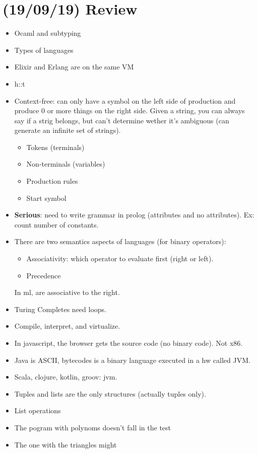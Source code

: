 \documentclass[11pt]{article}
\begin{document}
\section{(19/09/19) Review}
\label{sec:org1dee997}
\begin{itemize}
\item Ocaml and subtyping
\item Types of languages
\item Elixir and Erlang are on the same VM
\item h::t
\item Context-free: can only have a symbol on the left side of production and produce 0 or
more things on the right side. Given a string, you can always say if a strig belongs,
but can't determine wether it's ambiguous (can generate an infinite set of strings).
\begin{itemize}
\item Tokens (terminals)
\item Non-terminals (variables)
\item Production rules
\item Start symbol
\end{itemize}
\item \textbf{Serious}: need to write grammar in prolog (attributes and no attributes). Ex: count number of constants.
\item There are two semantics aspects of languages (for binary operators):
\begin{itemize}
\item Associativity: which operator to evaluate first (right or left).
\item Precedence
\end{itemize}
\item[{In ml,}] are associative to the right.
\item Turing Completes need loops.
\item Compile, interpret, and virtualize.
\item In javascript, the browser gets the source code (no binary code). Not x86.
\item Java is ASCII, bytecodes is a binary language executed in a hw called JVM.
\item Scala, clojure, kotlin, groov: jvm.
\item Tuples and lists are the only structures (actually tuples only).
\item List operations
\item The pogram with polynoms doesn't fall in the test
\item The one with the triangles might

\end{itemize}
\end{document}
